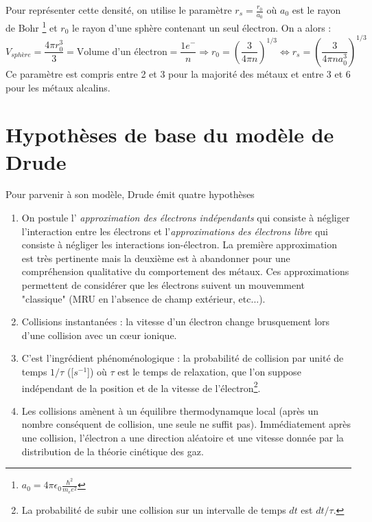 \noindent
Pour représenter cette densité, on utilise le paramètre $ r_s = \frac{r_0}{a_0}$
où $a_0$ est le rayon de Bohr \footnote{$a_0 = 4 \pi \epsilon_0 \frac{\hbar^2}{m_e e^2}$}
et $r_0$ le rayon d'une sphère contenant un seul 
électron. On a alors : 
\begin{equation}
	V_{sphère} = \frac{4\pi r^3_0}{3} = \text{Volume d'un électron} = \frac{1 e^-}{n} 
	\Longrightarrow r_0 = \left(\frac{3}{4\pi n}\right)^{1/3} \Longleftrightarrow r_s 
	= \left(\frac{3}{4\pi n a_0^3}\right)^{1/3}
\end{equation}
Ce paramètre est compris entre 2 et 3 pour la majorité des métaux et entre 3 et 6 
pour les métaux alcalins.
	
\newpage
\section{Hypothèses de base du modèle de Drude}
Pour parvenir à son modèle, Drude émit quatre hypothèses

\begin{enumerate}
	\item 
	      On postule l'\textit{
	      approximation des électrons indépendants} qui consiste à négliger l'interaction 
	      entre les électrons et l'\textit{approximations des électrons libre} qui consiste 
	      à négliger les interactions ion-électron. La première approximation est très
	      pertinente mais la deuxième est à abandonner pour une compréhension qualitative du
	      comportement des métaux. Ces approximations permettent de considérer que les électrons
	      suivent un mouvemment "classique" (MRU en l'absence de champ extérieur, etc...).
	      
	\item Collisions instantanées : la vitesse d'un électron change brusquement 
	      lors d'une collision avec un cœur ionique.
	      		
	\item C'est l'ingrédient phénoménologique : la probabilité de collision par unité de temps 
	      $1/\tau$ ([$s^{-1}$]) où $\tau$ est le temps de relaxation, que l'on suppose 
	      indépendant de la position et de la vitesse de l'électron\footnote{La probabilité 
	      	de subir une collision sur un intervalle de temps $dt$ est $dt/\tau$.}.
	      
	\item Les collisions amènent à un équilibre thermodynamque local
	      (après un nombre conséquent de collision, une seule ne suffit pas).
	      Immédiatement après une collision, l'électron a une direction aléatoire et une 
	      vitesse donnée par la distribution de la théorie cinétique des gaz.
\end{enumerate}


